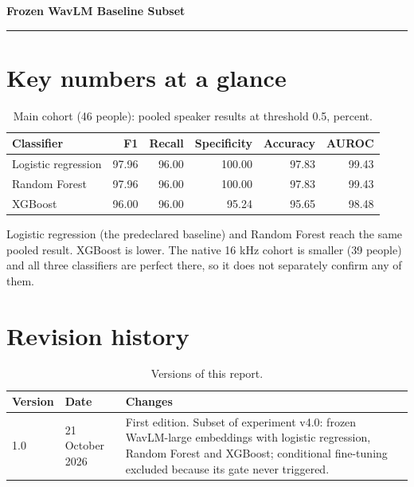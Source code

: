 \documentclass[11pt,a4paper]{article}
\begin{document}
\begin{center}{\LARGE\bfseries Frozen WavLM Baseline Subset\par}\vspace{6pt}{\Large Logistic regression, Random Forest and XGBoost on the same embeddings\par}\vspace{6pt}{\small Arannamoy Mondal (report author). Evidence: v4.0 WavLM proposal experiment (run 20261014T191654Z\_v4.0\_eb438e63b942), saved predictions only, no model retrained.\par}\end{center}
\vspace{4pt}\hrule\vspace{6pt}
\tableofcontents
\newpage
\section*{Key numbers at a glance}
\begin{table}[H]\centering\small\renewcommand{\arraystretch}{1.15}
\caption{Main cohort (46 people): pooled speaker results at threshold 0.5, percent.}
\begin{tabular}{lrrrrr}
\toprule
\textbf{Classifier} & \textbf{F1} & \textbf{Recall} & \textbf{Specificity} & \textbf{Accuracy} & \textbf{AUROC}\\
\midrule
Logistic regression & 97.96 & 96.00 & 100.00 & 97.83 & 99.43\\
Random Forest & 97.96 & 96.00 & 100.00 & 97.83 & 99.43\\
XGBoost & 96.00 & 96.00 & 95.24 & 95.65 & 98.48\\
\bottomrule
\end{tabular}\end{table}
Logistic regression (the predeclared baseline) and Random Forest reach the same pooled result. XGBoost is lower. The native 16 kHz cohort is smaller (39 people) and all three classifiers are perfect there, so it does not separately confirm any of them.

\section*{Revision history}
\begin{table}[H]\centering\small\renewcommand{\arraystretch}{1.15}
\caption{Versions of this report.}
\begin{tabular}{llp{11cm}}
\toprule
\textbf{Version} & \textbf{Date} & \textbf{Changes}\\
\midrule
1.0 & 21 October 2026 & First edition. Subset of experiment v4.0: frozen WavLM-large embeddings with logistic regression, Random Forest and XGBoost; conditional fine-tuning excluded because its gate never triggered.\\
\bottomrule
\end{tabular}\end{table}
\end{document}
